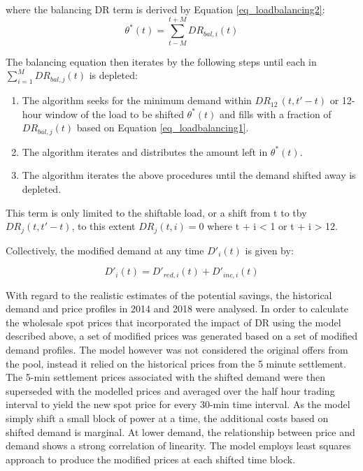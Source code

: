 \documentclass{pasa}%
\begin{document}
where the balancing DR term is derived by Equation \ref{eq_loadbalancing2}:
\begin{equation}\label{eq_loadbalancing2}
\theta^* (t) = \sum_{t - M}^{t + M} DR_{bal,i} (t)
\end{equation}

The balancing equation then iterates by the following steps until each in $\sum_{i=1}^{M} DR_{bal,j} (t)$ is depleted:
\begin{enumerate}
\item The algorithm seeks for the minimum demand within $DR_{12} \, (t, t'- t)$ or 12-hour window of the load to be shifted $\theta^* (t)$ and fills with a fraction of $DR_{bal,j} (t)$ based on Equation \ref{eq_loadbalancing1}.
\item The algorithm iterates and distributes the amount left in $\theta^* (t)$.
\item The algorithm iterates the above procedures until the demand shifted away is depleted.
\end{enumerate}

This term is only limited to the shiftable load, or a shift from t to t\textquotesingle by $DR_j (t, t'-t)$, to this extent $DR_j (t, i) = 0$ where t + i < 1 or t + i > 12. 

Collectively, the modified demand at any time $D'_i (t)$ is given by:

\begin{equation}\label{eq10}
D'_i (t) = D'_{red,i} (t) + D'_{inc,i} (t)
\end{equation}

With regard to the realistic estimates of the potential savings, the historical demand and price profiles in 2014 and 2018 were analysed. In order to calculate the wholesale spot prices that incorporated the impact of DR using the model described above, a set of modified prices was generated based on a set of modified demand profiles. The model however was not considered the original offers from the pool, instead it relied on the historical prices from the 5 minute settlement. The 5-min settlement prices associated with the shifted demand were then superseded with the modelled prices and averaged over the half hour trading interval to yield the new spot price for every 30-min time interval. As the model simply shift a small block of power at a time, the additional costs based on shifted demand is marginal. At lower demand, the relationship between price and demand shows a strong correlation of linearity. The model employs least squares approach to produce the modified prices at each shifted time block.
\end{document}
